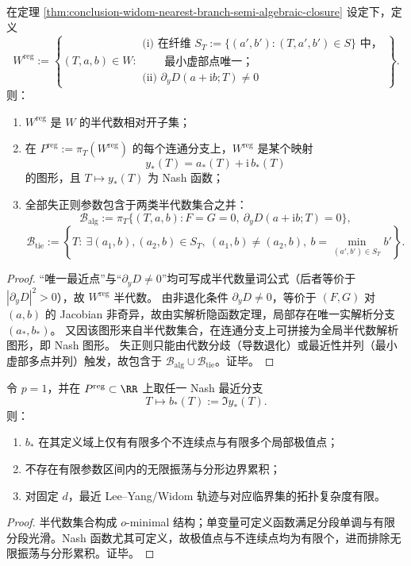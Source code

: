 \begin{theorem}\label{thm:conclusion-widom-nearest-branch-nash-regularity}
在定理 \ref{thm:conclusion-widom-nearest-branch-semi-algebraic-closure} 设定下，定义
\[
W^{\mathrm{reg}}
:=
\left\{
(T,a,b)\in W:
\begin{array}{l}
\text{(i) 在纤维 }S_T:=\{(a',b'):(T,a',b')\in S\}\text{ 中，}\\
\qquad\text{最小虚部点唯一；}\\
\text{(ii) }\partial_yD(a+\mathrm{i}b;T)\neq 0
\end{array}
\right\}.
\]
则：
\begin{enumerate}
  \item \(W^{\mathrm{reg}}\) 是 \(W\) 的半代数相对开子集；
  \item 在 \(P^{\mathrm{reg}}:=\pi_T(W^{\mathrm{reg}})\) 的每个连通分支上，\(W^{\mathrm{reg}}\) 是某个映射
  \[
  y_{\ast}(T)=a_{\ast}(T)+\mathrm{i}\,b_{\ast}(T)
  \]
  的图形，且 \(T\mapsto y_{\ast}(T)\) 为 Nash 函数；
  \item 全部失正则参数包含于两类半代数集合之并：
  \[
  \mathcal B_{\mathrm{alg}}
  :=
  \pi_T\!\{(T,a,b):F=G=0,\ \partial_yD(a+\mathrm{i}b;T)=0\},
  \]
  \[
  \mathcal B_{\mathrm{tie}}
  :=
  \left\{
  T:\ \exists (a_1,b),(a_2,b)\in S_T,\ (a_1,b)\neq(a_2,b),\ b=\min_{(a',b')\in S_T}b'
  \right\}.
  \]
\end{enumerate}
\end{theorem}
\begin{proof}
“唯一最近点”与“\(\partial_yD\neq 0\)”均可写成半代数量词公式（后者等价于 \(|\partial_yD|^2>0\)），故 \(W^{\mathrm{reg}}\) 半代数。
由非退化条件 \(\partial_yD\neq 0\)，等价于 \((F,G)\) 对 \((a,b)\) 的 Jacobian 非奇异，故由实解析隐函数定理，局部存在唯一实解析分支 \((a_\ast,b_\ast)\)。
又因该图形来自半代数集合，在连通分支上可拼接为全局半代数解析图形，即 Nash 图形。
失正则只能由代数分歧（导数退化）或最近性并列（最小虚部多点并列）触发，故包含于 \(\mathcal B_{\mathrm{alg}}\cup\mathcal B_{\mathrm{tie}}\)。证毕。
\end{proof}

\begin{corollary}\label{cor:conclusion-widom-tame-geometry-one-parameter}
令 \(p=1\)，并在 \(P^{\mathrm{reg}}\subset\RR\) 上取任一 Nash 最近分支
\[
T\longmapsto b_\ast(T):=\Im y_\ast(T).
\]
则：
\begin{enumerate}
  \item \(b_\ast\) 在其定义域上仅有有限多个不连续点与有限多个局部极值点；
  \item 不存在有限参数区间内的无限振荡与分形边界累积；
  \item 对固定 \(d\)，最近 Lee--Yang/Widom 轨迹与对应临界集的拓扑复杂度有限。
\end{enumerate}
\end{corollary}
\begin{proof}
半代数集合构成 \(o\)-minimal 结构；单变量可定义函数满足分段单调与有限分段光滑。Nash 函数尤其可定义，故极值点与不连续点均为有限个，进而排除无限振荡与分形累积。证毕。
\end{proof}

